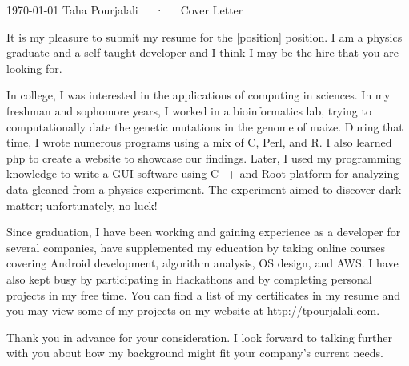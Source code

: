 \documentclass[11pt, a4paper]{awesome-cv}
\begin{document}
\makecvheader

\makecvfooter
  {\today}
  {Taha Pourjalali~~~·~~~Cover Letter}
  {}

\makelettertitle

\begin{cvletter}



It is my pleasure to submit my resume for the [position] position. I am a physics graduate and a self-taught developer and I think I may be the hire that you are looking for.  

In college, I was interested in the applications of computing in sciences.  In my freshman and sophomore years, I worked in a bioinformatics lab, trying to computationally date the genetic mutations in the genome of maize. During that time, I wrote numerous programs using a mix of C, Perl, and R.  I also learned php to create a website to showcase our findings.  
Later, I used my programming knowledge to write a GUI software using C++ and Root platform for analyzing data gleaned from a physics experiment.  The experiment aimed to discover dark matter; unfortunately, no luck!

Since graduation, I have been working and gaining experience as a developer for several companies,  
have supplemented my education by taking online courses covering Android development, algorithm analysis, OS design, and AWS. I have also kept busy by participating in Hackathons and by completing personal projects in my free time. You can find a list of my certificates in my resume and you may view some of my projects on my website at http://tpourjalali.com.


Thank you in advance for your consideration.  I look forward to talking further with you about how my background might fit your company's current needs.




\end{cvletter}
\end{document}
